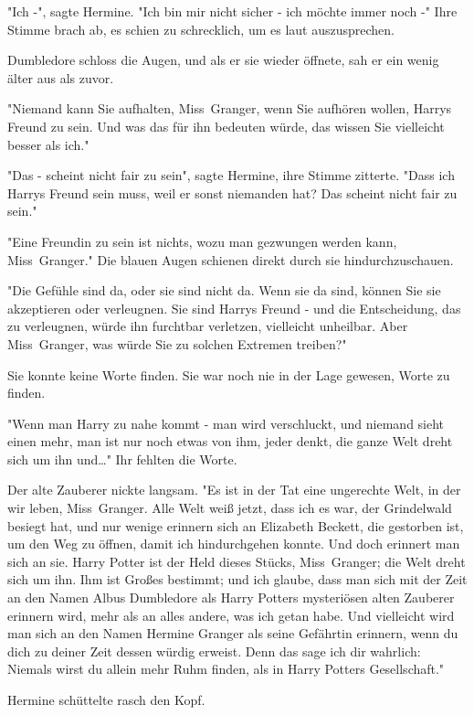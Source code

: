 {"Ich -", sagte Hermine. "Ich bin mir nicht sicher - ich möchte immer noch -" Ihre Stimme brach ab, es schien zu schrecklich, um es laut auszusprechen.

Dumbledore schloss die Augen, und als er sie wieder öffnete, sah er ein wenig älter aus als zuvor.

"Niemand kann Sie aufhalten, Miss~Granger, wenn Sie aufhören wollen, Harrys Freund zu sein. Und was das für ihn bedeuten würde, das wissen Sie vielleicht besser als ich."

"Das - scheint nicht fair zu sein", sagte Hermine, ihre Stimme zitterte. "Dass ich Harrys Freund sein muss, weil er sonst niemanden hat? Das scheint nicht fair zu sein."

"Eine Freundin zu sein ist nichts, wozu man gezwungen werden kann, Miss~Granger." Die blauen Augen schienen direkt durch sie hindurchzuschauen.

"Die Gefühle sind da, oder sie sind nicht da. Wenn sie da sind, können Sie sie akzeptieren oder verleugnen. Sie sind Harrys Freund - und die Entscheidung, das zu verleugnen, würde ihn furchtbar verletzen, vielleicht unheilbar. Aber Miss~Granger, was würde Sie zu solchen Extremen treiben?"

Sie konnte keine Worte finden. Sie war noch nie in der Lage gewesen, Worte zu finden.

"Wenn man Harry zu nahe kommt - man wird verschluckt, und niemand sieht einen mehr, man ist nur noch etwas von ihm, jeder denkt, die ganze Welt dreht sich um ihn und…" Ihr fehlten die Worte.

Der alte Zauberer nickte langsam. "Es ist in der Tat eine ungerechte Welt, in der wir leben, Miss~Granger. Alle Welt weiß jetzt, dass ich es war, der Grindelwald besiegt hat, und nur wenige erinnern sich an Elizabeth Beckett, die gestorben ist, um den Weg zu öffnen, damit ich hindurchgehen konnte. Und doch erinnert man sich an sie. Harry Potter ist der Held dieses Stücks, Miss~Granger; die Welt dreht sich um ihn. Ihm ist Großes bestimmt; und ich glaube, dass man sich mit der Zeit an den Namen Albus Dumbledore als Harry Potters mysteriösen alten Zauberer erinnern wird, mehr als an alles andere, was ich getan habe. Und vielleicht wird man sich an den Namen Hermine Granger als seine Gefährtin erinnern, wenn du dich zu deiner Zeit dessen würdig erweist. Denn das sage ich dir wahrlich: Niemals wirst du allein mehr Ruhm finden, als in Harry Potters Gesellschaft."

Hermine schüttelte rasch den Kopf.

}
